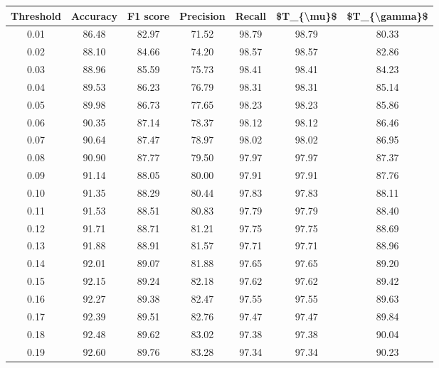\begin{tabular}{|c|c|c|c|c|c|c|}
\hline
 Threshold &  Accuracy &  F1 score &  Precision &  Recall &  \$T\_\{\textbackslash mu\}\$ &  \$T\_\{\textbackslash gamma\}\$ \\
\hline
      0.01 &     86.48 &     82.97 &      71.52 &   98.79 &      98.79 &         80.33 \\
      0.02 &     88.10 &     84.66 &      74.20 &   98.57 &      98.57 &         82.86 \\
      0.03 &     88.96 &     85.59 &      75.73 &   98.41 &      98.41 &         84.23 \\
      0.04 &     89.53 &     86.23 &      76.79 &   98.31 &      98.31 &         85.14 \\
      0.05 &     89.98 &     86.73 &      77.65 &   98.23 &      98.23 &         85.86 \\
      0.06 &     90.35 &     87.14 &      78.37 &   98.12 &      98.12 &         86.46 \\
      0.07 &     90.64 &     87.47 &      78.97 &   98.02 &      98.02 &         86.95 \\
      0.08 &     90.90 &     87.77 &      79.50 &   97.97 &      97.97 &         87.37 \\
      0.09 &     91.14 &     88.05 &      80.00 &   97.91 &      97.91 &         87.76 \\
      0.10 &     91.35 &     88.29 &      80.44 &   97.83 &      97.83 &         88.11 \\
      0.11 &     91.53 &     88.51 &      80.83 &   97.79 &      97.79 &         88.40 \\
      0.12 &     91.71 &     88.71 &      81.21 &   97.75 &      97.75 &         88.69 \\
      0.13 &     91.88 &     88.91 &      81.57 &   97.71 &      97.71 &         88.96 \\
      0.14 &     92.01 &     89.07 &      81.88 &   97.65 &      97.65 &         89.20 \\
      0.15 &     92.15 &     89.24 &      82.18 &   97.62 &      97.62 &         89.42 \\
      0.16 &     92.27 &     89.38 &      82.47 &   97.55 &      97.55 &         89.63 \\
      0.17 &     92.39 &     89.51 &      82.76 &   97.47 &      97.47 &         89.84 \\
      0.18 &     92.48 &     89.62 &      83.02 &   97.38 &      97.38 &         90.04 \\
      0.19 &     92.60 &     89.76 &      83.28 &   97.34 &      97.34 &         90.23 \\

\end{tabular}
